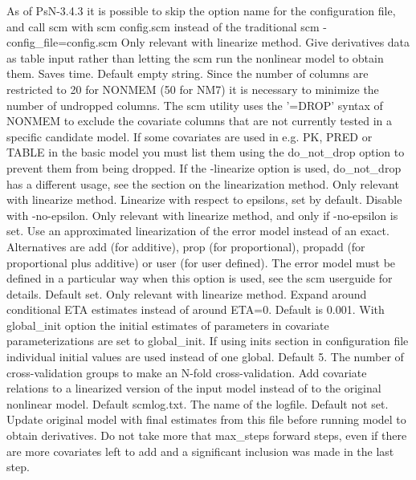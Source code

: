 \begin{optionlist}
As of PsN-3.4.3 it is possible to skip the option name for the configuration file, and call scm with
scm config.scm 
instead of the traditional
scm -config_file=config.scm
\nextopt
{} 
Only relevant with linearize method. Give derivatives data as table input
rather than letting the scm run the nonlinear model to obtain them. Saves time.
\nextopt
{} 
Default empty string. Since the number of columns are restricted to 20 for NONMEM (50 for NM7) 
it is necessary to minimize the number of undropped columns. The scm utility uses the '=DROP' 
syntax of NONMEM to exclude the covariate columns that are not currently tested in a specific 
candidate model. If some covariates are used in e.g. PK, PRED or TABLE in the basic model you must 
list them using the do\_not\_drop option to prevent them from being dropped. If the -linearize 
option is used, do\_not\_drop has a different usage, see the section on the linearization method. 
\nextopt
{} 
Only relevant with linearize method. Linearize with respect to epsilons,
set by default. Disable with -no-epsilon.
\nextopt
{} 
Only relevant with linearize method, and only if -no-epsilon is set. 
Use an approximated linearization of the error model instead of an exact.
Alternatives are add (for additive), prop (for proportional),
propadd (for proportional plus additive) or user (for user defined).
The error model must be defined in a particular way when this option is used,
see the scm userguide for details.
\nextopt
{} 
Default set. Only relevant with linearize method. Expand around 
conditional ETA estimates instead of around ETA=0.    
\nextopt
{}
Default is 0.001. With global_init option the initial estimates of parameters
in covariate parameterizations are set to global\_init. If using inits section 
in configuration file individual initial values are used instead of one global.
\nextopt
{}
Default 5. The number of cross-validation groups to make an N-fold cross-validation. 	
\nextopt
{} 
Add covariate relations to a linearized version of the input model instead of
to the original nonlinear model.
\nextopt
{}
Default scmlog.txt. The name of the logfile.
\nextopt
{} 
Default not set. Update original model with final estimates from this file 
before running model to obtain derivatives.
\nextopt
{} 
Do not take more that max\_steps forward steps, even if there are more covariates 
left to add and a significant inclusion was made in the last step.

\end{optionlist}
